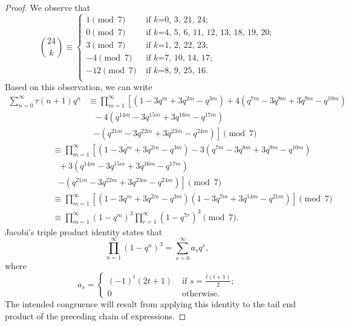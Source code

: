 \documentclass[10pt]{article}
\theoremstyle{definition}
\begin{document}
\begin{proof}
We observe that
\[
{24\choose{k}}\equiv \begin{cases}
1\pmod{7}&\text{ if $k$=0, 3, 21, 24;}\\ 
0\pmod{7}&\text{ if $k$=4, 5, 6, 11, 12, 13, 18, 19, 20;}\\
3\pmod{7}&\text{ if $k$=1, 2, 22, 23;}\\
-4\pmod{7}&\text{ if $k$=7, 10, 14, 17;}\\
-12\pmod{7}&\text{ if $k$=8, 9, 25, 16.}\\
\end{cases}
\]
Based on this observation, we can write 
\begin{align*}
\sum_{n=0}^{\infty}\tau(n+1)q^n
&\equiv\prod_{m=1}^{\infty} \left[\left(1-3q^m+3q^{2m}-q^{3m}\right)+4\left(q^{7m}-3q^{8m}+3q^{9m}-q^{10m}\right)\right.\\
&\text{\ \ \ \ \ \ \ \ }-4\left(q^{14m}-3q^{15m}+3q^{16m}-q^{17m}\right)\\
&\text{\ \ \ \ \ \ \ \ }\left.-\left(q^{21m}-3q^{22m}+3q^{23m}-q^{24m}\right)\right]\pmod{7}
\end{align*}
\begin{align*}
\ \ \ \ \ \ \ \ \ \ \ \ \ \ \ \ \ \ \ \ &\equiv\prod_{m=1}^{\infty}\left[\left(1-3q^m+3q^{2m}-q^{3m}\right)-3\left(q^{7m}-3q^{8m}+3q^{9m}-q^{10m}\right)\right.\\
&\text{\ \ \ \ \ \ \ \ }+3\left(q^{14m}-3q^{15m}+3q^{16m}-q^{17m}\right)\\
&\text{\ \ \ \ \ \ \ \ }\left.-\left(q^{21m}-3q^{22m}+3q^{23m}-q^{24m}\right)\right]\pmod{7}\\
&\equiv\prod_{m=1}^{\infty}\left[\left(1-3q^m+3q^{2m}-q^{3m}\right)\left(1-3q^{7m}+3q^{14m}-q^{21m}\right)\right]\pmod{7}\\ 
&\equiv\prod_{m=1}^{\infty}\left(1-q^{m}\right) ^3 \prod_{r=1}^{\infty}\left(1-q^{7r}\right)^3\pmod{7}.
\end{align*}
Jacobi's triple product identity states that
\begin{equation}\label{JTPI}
\prod_{n=1}^{\infty}(1-q^n)^3=\sum_{s=0}^{\infty}a_sq^s,
\end{equation}
where 
\[a_s=\begin{cases}
(-1)^t(2t+1)&\text{ if $s=\frac{t(t+1)}{2}$;}\\
0&\text{ otherwise.}
\end{cases}
\]
The intended congruence will result from applying this identity to the tail end product of the preceding chain of expressions.
\end{proof}
\end{document}

